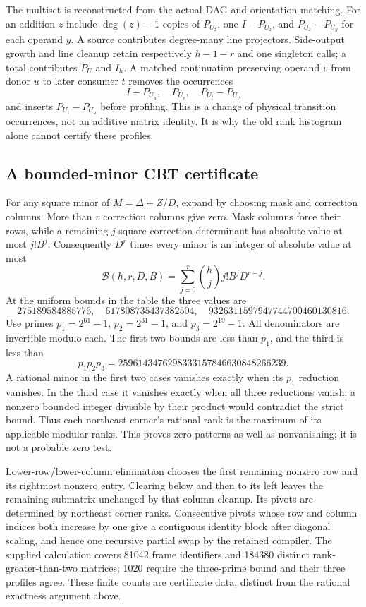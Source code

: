 The multiset is reconstructed from the actual DAG and orientation
matching. For an addition $z$ include $\deg(z)-1$ copies of $P_{U_z}$,
one $I-P_{U_z}$, and $P_{U_z}-P_{U_y}$ for each operand $y$.
A source contributes degree-many line projectors. Side-output growth
and line cleanup retain respectively $h-1-r$ and one singleton calls;
a total contributes $P_U$ and $I_h$.
A matched continuation preserving operand $v$ from donor $u$ to later
consumer $t$ removes the occurrences
\[
 I-P_{U_u},\quad P_{U_v},\quad P_{U_t}-P_{U_v}
\]
and inserts $P_{U_t}-P_{U_u}$ before profiling. This is a change of
physical transition occurrences, not an additive matrix identity.
It is why the old rank histogram alone cannot certify these profiles.

\subsection{A bounded-minor CRT certificate}
For any square minor of $M=\Delta+Z/D$, expand by choosing mask and
correction columns. More than $r$ correction columns give zero.
Mask columns force their rows, while a remaining $j$-square correction
determinant has absolute value at most $j!B^j$. Consequently $D^r$
times every minor is an integer of absolute value at most
\[
 \mathcal B(h,r,D,B)=\sum_{j=0}^r\binom hj j!B^jD^{r-j}.
\]
At the uniform bounds in the table the three values are
\[
 275189584885776,\quad617808735437382504,\quad
 9326311597947744700460130816.
\]
Use primes $p_1=2^{61}-1$, $p_2=2^{31}-1$, and $p_3=2^{19}-1$.
All denominators are invertible modulo each. The first two bounds are
less than $p_1$, and the third is less than
\[
 p_1p_2p_3=2596143476298333157846630848266239.
\]
A rational minor in the first two cases vanishes exactly when its
$p_1$ reduction vanishes. In the third case it vanishes exactly when
all three reductions vanish: a nonzero bounded integer divisible by
their product would contradict the strict bound. Thus each northeast
corner's rational rank is the maximum of its applicable modular ranks.
This proves zero patterns as well as nonvanishing; it is not a probable
zero test.

Lower-row/lower-column elimination chooses the first remaining nonzero
row and its rightmost nonzero entry. Clearing below and then to its
left leaves the remaining submatrix unchanged by that column cleanup.
Its pivots are determined by northeast corner ranks. Consecutive pivots
whose row and column indices both increase by one give a contiguous
identity block after diagonal scaling, and hence one recursive partial
swap by the retained compiler. The supplied calculation covers 81042
frame identifiers and 184380 distinct rank-greater-than-two matrices;
1020 require the three-prime bound and their three profiles agree.
These finite counts are certificate data, distinct from the rational
exactness argument above.

